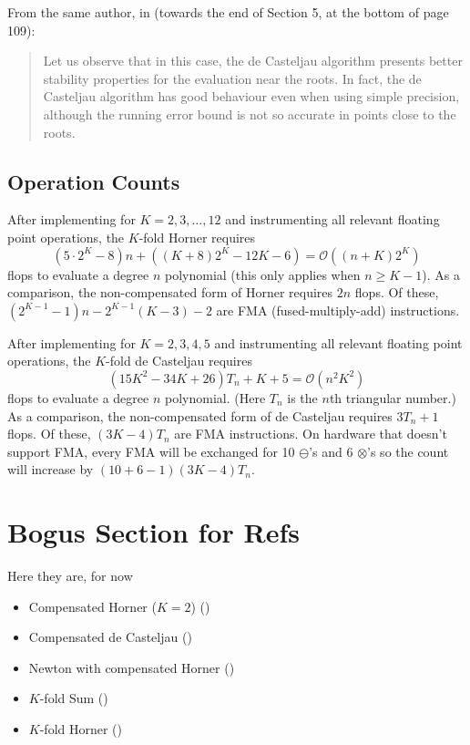 \documentclass[letterpaper,10pt]{article}
\theoremstyle{definition}
\begin{document}
\noindent From the same author, in \cite{Mainar2005} (towards the
end of Section 5, at the bottom of page 109):

\begin{quote}
  Let us observe that in this case, the de Casteljau algorithm presents
  better stability properties for the evaluation near the roots. In fact,
  the de Casteljau algorithm has good behaviour even when using simple
  precision, although the running error bound is not so accurate in points
  close to the roots.
\end{quote}

\subsection{Operation Counts}

After implementing for \(K = 2, 3, \ldots, 12\) and instrumenting all
relevant floating point operations, the \(K\)-fold Horner requires
\begin{equation}
(5 \cdot 2^K - 8)n + \left((K + 8) 2^K - 12K - 6\right) =
\mathcal{O}\left((n + K)2^K\right)
\end{equation}
flops to evaluate a degree \(n\) polynomial (this only applies when
\(n \geq K - 1\)). As a comparison, the
non-compensated form of Horner requires \(2n\) flops. Of these,
\(\left(2^{K - 1} - 1\right)n - 2^{K - 1}(K - 3) - 2\) are
FMA (fused-multiply-add) instructions.

After implementing for \(K = 2, 3, 4, 5\) and instrumenting all relevant
floating point operations, the \(K\)-fold de Casteljau requires
\begin{equation}
(15K^2 - 34K + 26)T_n + K + 5 =
\mathcal{O}\left(n^2 K^2\right)
\end{equation}
flops to evaluate a degree \(n\) polynomial. (Here \(T_n\) is the
\(n\)th triangular number.) As a comparison, the non-compensated form of
de Casteljau requires \(3 T_n + 1\) flops. Of these, \((3K - 4)T_n\) are
FMA instructions. On hardware that doesn't support FMA,
every FMA will be exchanged for 10 \(\ominus\)'s and 6 \(\otimes\)'s so the
count will increase by \((10 + 6 - 1)(3K - 4)T_n\).

\section{Bogus Section for Refs}

Here they are, for now
\begin{itemize}
  \item Compensated Horner (\(K = 2\)) (\cite{langlois_et_al:DSP:2006:442})
  \item Compensated de Casteljau (\cite{Jiang2010})
  \item Newton with compensated Horner (\cite{Graillat2008})
  \item \(K\)-fold Sum (\cite{Ogita2005})
  \item \(K\)-fold Horner (\cite{Graillat2009})
\end{itemize}



\end{document}
